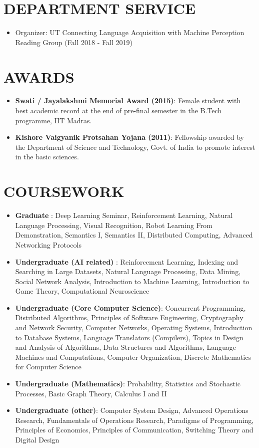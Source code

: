 \documentclass[letterpaper,10pt]{resume}
\begin{document}
{\section{DEPARTMENT SERVICE}
\begin{itemize}
\item Organizer: UT Connecting Language Acquisition with Machine Perception Reading Group (Fall 2018 - Fall 2019)
\end{itemize}
\vspace{0.2cm}

\section{AWARDS}
\begin{itemize}
\item \textbf{Swati / Jayalakshmi Memorial Award (2015)}: Female student with best academic record at the end of pre-final semester in the B.Tech programme, IIT Madras.
\item \textbf{Kishore Vaigyanik Protsahan Yojana (2011)}: Fellowship awarded by the Department of Science and Technology, Govt. of India to promote interest in the basic sciences.
\end{itemize}
\vspace{0.2cm}

\section{COURSEWORK}
\begin{itemize}
\item \textbf{Graduate} : Deep Learning Seminar, Reinforcement Learning, Natural Language Processing, Visual Recognition, Robot Learning From Demonstration, Semantics I, Semantics II, Distributed Computing, Advanced Networking Protocols
\item \textbf{Undergraduate (AI related)} : Reinforcement Learning, Indexing and Searching in Large Datasets, Natural Language Processing, Data Mining, Social Network Analysis, Introduction to Machine Learning, Introduction to Game Theory, Computational Neuroscience 
\item \textbf{Undergraduate (Core Computer Science)}: Concurrent Programming, Distributed Algorithms, Principles of Software Engineering, Cryptography and Network Security, Computer Networks, Operating Systems, Introduction to Database Systems, Language Translators (Compilers), Topics in Design and Analysis of Algorithms, Data Structures and Algorithms, Language Machines and Computations, Computer Organization, Discrete Mathematics for Computer Science
\item \textbf{Undergraduate (Mathematics)}: Probability, Statistics and Stochastic Processes, Basic Graph Theory, Calculus I and II
\item \textbf{Undergraduate (other)}: Computer System Design, Advanced Operations Research, Fundamentals of Operations Research, Paradigms of Programming, Principles of Economics, Principles of Communication, Switching Theory and Digital Design
\end{itemize}
\vspace{0.2cm}

}
\end{document}

